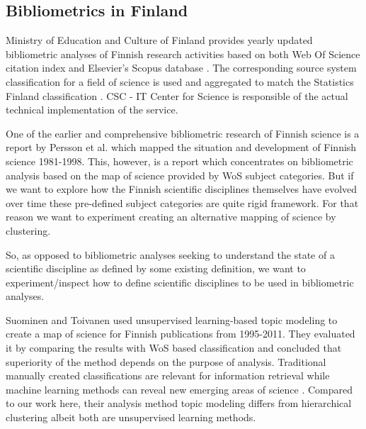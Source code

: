 

\subsection{Bibliometrics in Finland}
Ministry of Education and Culture of Finland provides yearly
updated bibliometric analyses of Finnish research activities 
based on both Web Of Science citation index 
and Elsevier's Scopus database \cite[Vipunen 
service]{noauthor_ministry_2019}. The corresponding source 
system classification for a field of science is used and
aggregated to match the Statistics Finland classification 
\cite{auranen_tieteen_2018}. CSC - 
IT Center for Science is responsible of the actual technical 
implementation of the service.

One of the earlier and comprehensive bibliometric research of 
Finnish science is a report by Persson et al. 
\cite{persson_bibliometric_2000} which mapped the situation and 
development of Finnish science 1981-1998.
This, however, is a report which concentrates on bibliometric 
analysis based on the map of science provided by WoS subject 
categories. But if we want to explore how the Finnish scientific 
disciplines themselves have evolved over time these pre-defined 
subject categories are quite rigid framework. For that reason we 
want to experiment creating an alternative mapping of science by 
clustering. 

So, as opposed to bibliometric analyses seeking to understand the
state of a scientific discipline as defined by some existing 
definition, we want to experiment/inspect how to define 
scientific disciplines to be used in bibliometric analyses.


Suominen and Toivanen used unsupervised learning-based topic 
modeling to create a map of science for Finnish publications from 
1995-2011. They evaluated it by comparing the results with WoS 
based classification and concluded that superiority of the method
depends on the purpose of analysis. Traditional manually created 
classifications are relevant for information retrieval while 
machine learning methods can reveal new emerging areas of science 
\cite{suominen_map_2016}. Compared to our work here, their 
analysis method topic modeling differs from hierarchical 
clustering albeit both are unsupervised learning methods.


